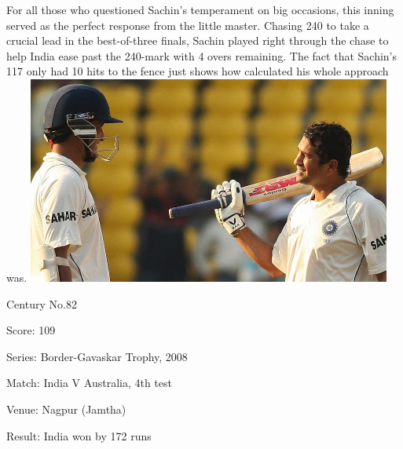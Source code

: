 \documentclass[11pt, a4paper]{article}
\begin{document}
For all those who questioned Sachin's temperament on big occasions, this inning served as the perfect response from the little master. Chasing 240 to take a crucial lead in the best-of-three finals, Sachin played right through the chase to help India ease past the 240-mark with 4 overs remaining. The fact that Sachin's 117 only had 10 hits to the fence just shows how calculated his whole approach was. 
\newpage
\includegraphics[width=0.9\textwidth]{pics/82.jpg}

Century No.82 

Score: 109 

Series: Border-Gavaskar Trophy, 2008 

Match: India V Australia, 4th test 

Venue: Nagpur (Jamtha) 

Result: India won by 172 runs 
\end{document}
